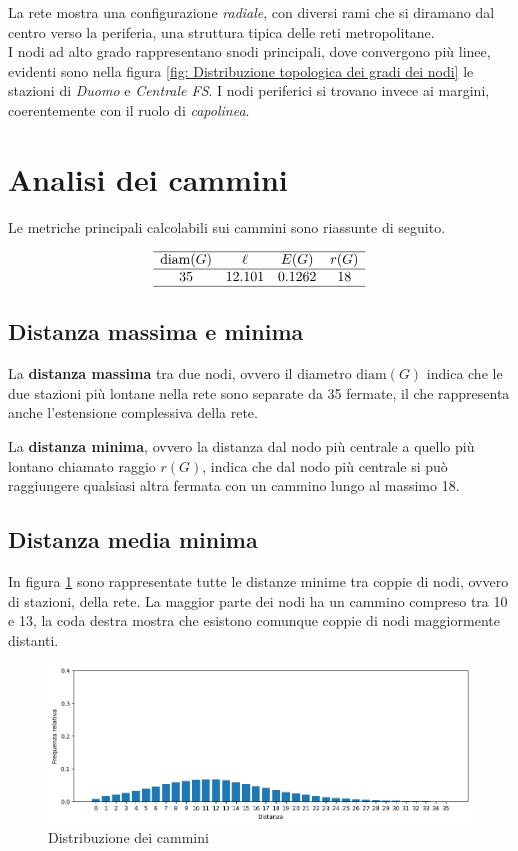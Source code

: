 La rete mostra una configurazione \textit{radiale}, con diversi rami che si diramano dal centro verso la periferia, una struttura tipica delle reti metropolitane. \\
I nodi ad alto grado rappresentano snodi principali, dove convergono più linee, evidenti sono nella figura \ref{fig: Distribuzione topologica dei gradi dei nodi} le stazioni di \textit{Duomo} e \textit{Centrale FS}. I nodi periferici si trovano invece ai margini, coerentemente con il ruolo di \textit{capolinea}.

\section{Analisi dei cammini}
Le metriche principali calcolabili sui cammini sono riassunte di seguito.

\[
\begin{array}{cccc}
\hline
\mathrm{diam}(G) & \ell & E(G) & r(G) \\
\hline
35 & 12.101 & 0.1262 & 18 \\
\hline
\end{array}
\]

\subsection{Distanza massima e minima}
La \textbf{distanza massima} tra due nodi, ovvero il diametro $\mathrm{diam}(G)$ indica che le due stazioni più lontane nella rete sono separate da 35 fermate, il che rappresenta anche l'estensione complessiva della rete.

La \textbf{distanza minima}, ovvero la distanza dal nodo più centrale a quello più lontano chiamato raggio $r(G)$, indica che dal nodo più centrale si può raggiungere qualsiasi altra fermata con un cammino lungo al massimo 18.

\subsection{Distanza media minima}
In figura \ref{fig: Distribuzione dei cammini} sono rappresentate tutte le distanze minime tra coppie di nodi, ovvero di stazioni, della rete. La maggior parte dei nodi ha un cammino compreso tra 10 e 13, la coda destra mostra che esistono comunque coppie di nodi maggiormente distanti.


\vspace{1em}
\begin{figure}[h!]
    \centering
    \includegraphics[width=0.8\linewidth]{Immagini//Capitoli//cap3/dist_cammini.png}
    \caption{Distribuzione dei cammini}
    \label{fig: Distribuzione dei cammini}
\end{figure}
\vspace{1em}


